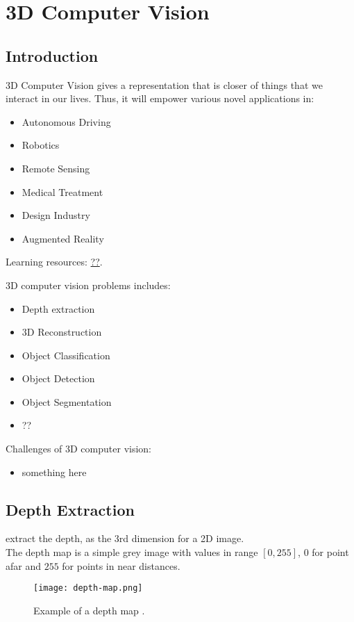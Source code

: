 \chapter{3D Computer Vision}
\label{cha:3D-cv}

\section{Introduction}
\label{sec:3D-cv-intro}
3D Computer Vision gives a representation that is closer of things that we interact in our lives. Thus, it will empower various novel applications in:
\begin{itemize}
	\item Autonomous Driving
	\item Robotics
	\item Remote Sensing
	\item Medical Treatment
	\item Design Industry
	\item Augmented Reality
\end{itemize}

\todo{} Learning resources: \href{https://??}{??}.

3D computer vision problems includes:
\begin{itemize}
	\item Depth extraction
	\item 3D Reconstruction
	\item Object Classification
	\item Object Detection
	\item Object Segmentation
	\item ??
\end{itemize}

Challenges of 3D computer vision:
\begin{itemize}
	\item something here
\end{itemize}

\section{Depth Extraction}
 extract the depth, as the 3rd dimension for a 2D image.\\
The depth map is a simple grey image with values in range $[0, 255]$, $0$ for point afar and $255$ for points in near distances.
\begin{figure}[hbt!]
	\centering
	\texttt{[image: depth-map.png]}
	\caption{Example of a depth map \cite{tjaden2018}.}
\end{figure}

